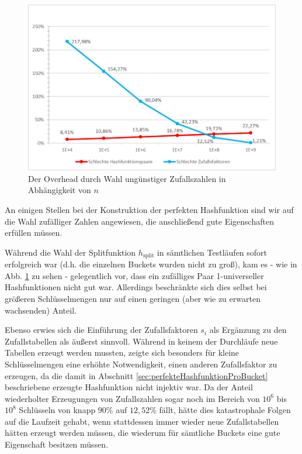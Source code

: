 \documentclass[a4paper,12pt,twoside]{report}
\begin{document}
\begin{figure}[tbhp]
\centering
\includegraphics[width=\textwidth]{diagrams/OverheadZufallszahlen.png} 
\caption{Der Overhead durch Wahl ungünstiger Zufallszahlen in Abhängigkeit von $n$}
\label{img:OverheadZufallszahlen}
\end{figure}
An einigen Stellen bei der Konstruktion der perfekten Hashfunktion sind wir auf die Wahl zufälliger Zahlen angewiesen, die anschließend gute Eigenschaften erfüllen müssen.

Während die Wahl der Splitfunktion $h_{\text{split}}$ in sämtlichen Testläufen sofort erfolgreich war (d.h. die einzelnen Buckets wurden nicht zu groß), kam es - wie in Abb. \ref{img:OverheadZufallszahlen} zu sehen - gelegentlich vor, dass ein zufälliges Paar 1-universeller Hashfunktionen nicht gut war.
Allerdings beschränkte sich dies selbst bei größeren Schlüsselmengen nur auf einen geringen (aber wie zu erwarten wachsenden) Anteil.

Ebenso erwies sich die Einführung der Zufallsfaktoren $s_i$ als Ergänzung zu den Zufallstabellen als äußerst sinnvoll.
Während in keinem der Durchläufe neue Tabellen erzeugt werden mussten, zeigte sich besonders für kleine Schlüsselmengen eine erhöhte Notwendigkeit, einen anderen Zufallsfaktor zu erzeugen, da die damit in Abschnitt \ref{sec:perfekteHashfunktionProBucket} beschriebene erzeugte Hashfunktion nicht injektiv war.
Da der Anteil wiederholter Erzeugungen von Zufallszahlen sogar noch im Bereich von $10^6$ bis $10^8$ Schlüsseln von knapp $90\%$ auf $12,52\%$ fällt, hätte dies katastrophale Folgen auf die Laufzeit gehabt, wenn stattdessen immer wieder neue Zufallstabellen hätten erzeugt werden müssen, die wiederum für sämtliche Buckets eine gute Eigenschaft besitzen müssen.
\end{document}
